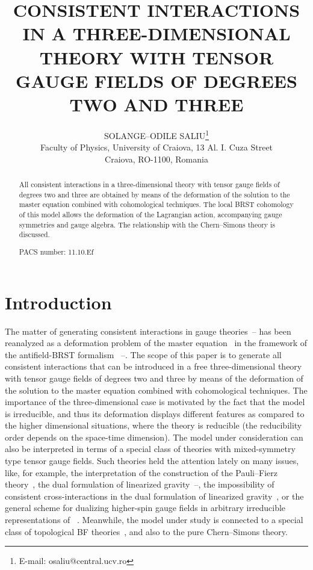 \documentclass[a4paper,11pt]{article}
\begin{document}
\title{CONSISTENT INTERACTIONS IN A THREE-DIMENSIONAL THEORY WITH TENSOR GAUGE
FIELDS OF DEGREES TWO AND THREE}
\author{SOLANGE--ODILE SALIU\thanks{%
E-mail: osaliu@central.ucv.ro} \\
Faculty of Physics, University of Craiova, 13 Al. I. Cuza Street\\
Craiova, RO-1100, Romania}
\maketitle

\begin{abstract}
All consistent interactions in a three-dimensional theory with tensor gauge
fields of degrees two and three are obtained by means of the deformation of
the solution to the master equation combined with cohomological techniques.
The local BRST cohomology of this model allows the deformation of the
Lagrangian action, accompanying gauge symmetries and gauge algebra. The
relationship with the Chern--Simons theory is discussed.

PACS number: 11.10.Ef
\end{abstract}

\section{Introduction}

The matter of generating consistent interactions in gauge theories~\cite
{alpha1}--\cite{alpha3} has been reanalyzed as a deformation problem of the
master equation~\cite{def} in the framework of the antifield-BRST formalism~%
\cite{1}--\cite{5}. The scope of this paper is to generate all consistent
interactions that can be introduced in a free three-dimensional theory with
tensor gauge fields of degrees two and three by means of the deformation of
the solution to the master equation combined with cohomological techniques.
The importance of the three-dimensional case is motivated by the fact that
the model is irreducible, and thus its deformation displays different
features as compared to the higher dimensional situations, where the theory
is reducible (the reducibility order depends on the space-time dimension).
The model under consideration can also be interpreted in terms of a special
class of theories with mixed-symmetry type tensor gauge fields. Such
theories held the attention lately on many issues, like, for example, the
interpretation of the construction of the Pauli--Fierz theory~\cite{pf}, the
dual formulation of linearized gravity~\cite{dual}--\cite{lingr}, the
impossibility of consistent cross-interactions in the dual formulation of
linearized gravity~\cite{lingr}, or the general scheme for dualizing
higher-spin gauge fields in arbitrary irreducible representations of \coordHE{}~\cite{gensch}. Meanwhile, the model under study is connected to
a special class of topological BF theories~\cite{topBF}, and also to the
pure Chern--Simons theory.
\end{document}
